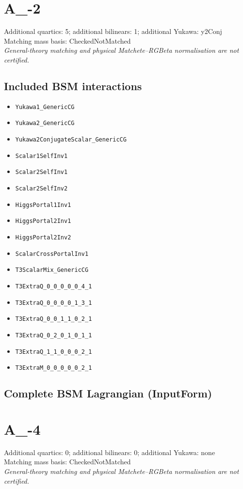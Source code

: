 \documentclass[10pt,a4paper]{article}
\begin{document}
\section{A\_-2}
Additional quartics: 5; additional bilinears: 1; additional Yukawa: y2Conj\\
Matching mass basis: CheckedNotMatched\\
\emph{General-theory matching and physical Matchete--RGBeta normalisation are not certified.}
\subsection*{Included BSM interactions}
\begin{itemize}
\item \texttt{Yukawa1\_GenericCG}
\item \texttt{Yukawa2\_GenericCG}
\item \texttt{Yukawa2ConjugateScalar\_GenericCG}
\item \texttt{Scalar1SelfInv1}
\item \texttt{Scalar2SelfInv1}
\item \texttt{Scalar2SelfInv2}
\item \texttt{HiggsPortal1Inv1}
\item \texttt{HiggsPortal2Inv1}
\item \texttt{HiggsPortal2Inv2}
\item \texttt{ScalarCrossPortalInv1}
\item \texttt{T3ScalarMix\_GenericCG}
\item \texttt{T3ExtraQ\_0\_0\_0\_0\_0\_4\_1}
\item \texttt{T3ExtraQ\_0\_0\_0\_0\_1\_3\_1}
\item \texttt{T3ExtraQ\_0\_0\_1\_1\_0\_2\_1}
\item \texttt{T3ExtraQ\_0\_2\_0\_1\_0\_1\_1}
\item \texttt{T3ExtraQ\_1\_1\_0\_0\_0\_2\_1}
\item \texttt{T3ExtraM\_0\_0\_0\_0\_0\_2\_1}
\end{itemize}
\subsection*{Complete BSM Lagrangian (InputForm)}

\clearpage
\section{A\_-4}
Additional quartics: 0; additional bilinears: 0; additional Yukawa: none\\
Matching mass basis: CheckedNotMatched\\
\emph{General-theory matching and physical Matchete--RGBeta normalisation are not certified.}
\end{document}
